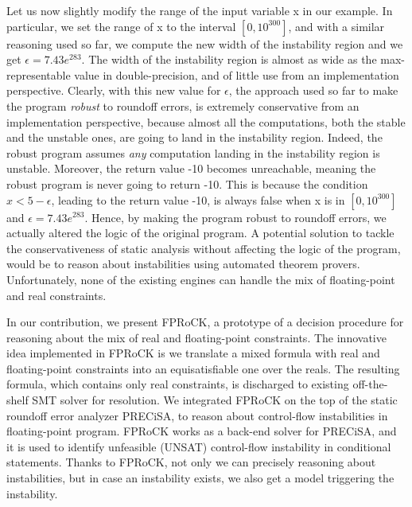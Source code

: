 Let us now slightly modify the range of the input variable x in our example. 
%
In particular, we set the range of x to the interval $[0, 10^{300}]$, and with a similar reasoning used so far, we compute the new width of the instability region and we get $\epsilon=7.43e^{283}$.
%
The width of the instability region is almost as wide as the max-representable value in double-precision, and of little use from an implementation perspective. 
%
Clearly, with this new value for $\epsilon$, the approach used so far to make the program \emph{robust} to roundoff errors, is extremely conservative from an implementation perspective, because almost all the computations, both the stable and the unstable ones, are going to land in the instability region.
%
Indeed, the robust program assumes \emph{any} computation landing in the instability region is unstable.
%
Moreover, the return value -10 becomes unreachable, meaning the robust program is never going to return -10.
%
%
This is because the condition $x<5-\epsilon$, leading to the return value -10, is always false when x is in $[0, 10^{300}]$ and $\epsilon=7.43e^{283}$.
%
Hence, by making the program robust to roundoff errors, we actually altered the logic of the original program.
%
A potential solution to tackle the conservativeness of static analysis without affecting the logic of the program, would be to reason about instabilities using automated theorem provers.
%
Unfortunately, none of the existing engines can handle the mix of floating-point and real constraints.
%

%
In our contribution, we present FPRoCK, a prototype of a decision procedure for reasoning about the mix of real and floating-point constraints.
%
The innovative idea implemented in FPRoCK is we translate a mixed formula with real and floating-point constraints into an equisatisfiable one over the reals.
%
The resulting formula, which contains only real constraints, is discharged to existing off-the-shelf SMT solver for resolution.
%
We integrated FPRoCK on the top of the static roundoff error analyzer PRECiSA, to reason about control-flow instabilities in floating-point program.
%
FPRoCK works as a back-end solver for PRECiSA, and it is used to identify unfeasible (UNSAT) control-flow instability in conditional statements.
%
Thanks to FPRoCK, not only we can precisely reasoning about instabilities, but in case an instability exists, we also get a model triggering the instability.

